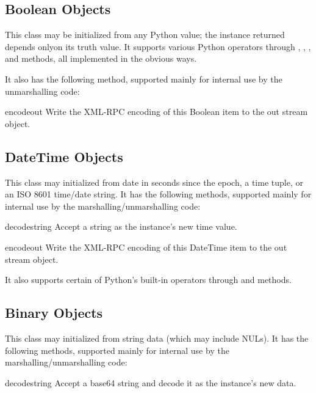 \subsection{Boolean Objects \label{boolean-objects}}

This class may be initialized from any Python value; the instance
returned depends onlyon its truth value.  It supports various Python
operators through , , ,
and  methods, all implemented in the obvious ways.  

It also has the following method, supported mainly for internal use by
the unmarshalling code:

\begin{methoddesc}{encode}{out}
Write the XML-RPC encoding of this Boolean item to the out stream object.
\end{methoddesc}

\subsection{DateTime Objects \label{datetime-objects}}

This class may initialized from date in seconds since the epoch, a
time tuple, or an ISO 8601 time/date string.  It has the following
methods, supported mainly for internal use by the
marshalling/unmarshalling code:

\begin{methoddesc}{decode}{string}
Accept a string as the instance's new time value.
\end{methoddesc}

\begin{methoddesc}{encode}{out}
Write the XML-RPC encoding of this DateTime item to the out stream object.
\end{methoddesc}

It also supports certain of Python's built-in operators through 
 and  methods.

\subsection{Binary Objects \label{binary-objects}}

This class may initialized from string data (which may include NULs).
It has the following methods, supported mainly for internal use by the
marshalling/unmarshalling code:

\begin{methoddesc}{decode}{string}
Accept a base64 string and decode it as the instance's new data.
\end{methoddesc}

